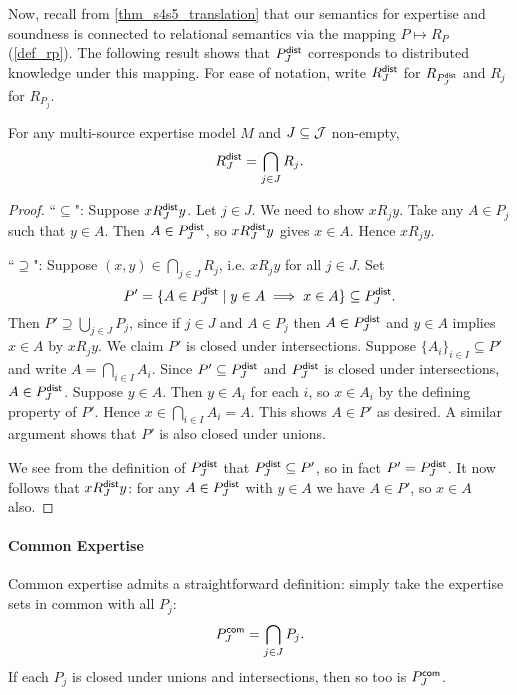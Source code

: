 Now, recall from \cref{thm_s4s5_translation} that our semantics for
expertise and soundness is connected to relational semantics via the mapping
$P \mapsto R_P$ (\cref{def_rp}). The following result shows that
$P^{\mathsf{dist}}_J$ corresponds to distributed knowledge under this mapping. For
ease of notation, write $R^{\mathsf{dist}}_J$ for $R_{P^{\mathsf{dist}}_J}$ and
$R_j$ for $R_{P_j}$.

\begin{proposition}
\label{prop_rpdist}
For any multi-source expertise model $M$ and $J \subseteq \mathcal{J}$ non-empty,
\[
R^{\mathsf{dist}}_J = \bigcap_{j \in J}{R_j}.\]
\end{proposition}

\begin{proof}
    ``$\subseteq$": Suppose $x{R^{\mathsf{dist}}_J}y$. Let $j \in J$.  We need to show
    $x{R_j}y$. Take any $A \in P_j$ such that $y \in A$. Then $A \in P^{\mathsf{dist}}_J$,
    so $x{R^{\mathsf{dist}}_J}y$ gives $x \in A$. Hence $x{R_j}y$.

    ``$\supseteq$": Suppose $(x, y) \in \bigcap_{j \in J}{R_j}$, i.e. $x{R_j}y$
    for all $j \in J$. Set
    \[
        P' = \{A \in P^{\mathsf{dist}}_J \mid y \in A \implies x \in A\}
        \subseteq P^{\mathsf{dist}}_J.
    \]
    Then $P' \supseteq \bigcup_{j \in J}{P_j}$, since if $j \in J$ and $A \in
    P_j$ then $A \in P^{\mathsf{dist}}_J$ and $y \in A$ implies $x \in A$ by $x{R_j}y$.
    We claim $P'$ is closed under intersections. Suppose $\{A_i\}_{i \in I}
    \subseteq P'$ and write $A = \bigcap_{i \in I}{A_i}$. Since $P' \subseteq
    P^{\mathsf{dist}}_J$ and $P^{\mathsf{dist}}_J$ is closed under intersections, $A \in P^{\mathsf{dist}}_J$.
    Suppose $y \in A$.  Then $y \in A_i$ for each $i$, so $x \in A_i$ by the
    defining property of $P'$. Hence $x \in \bigcap_{i \in I}{A_i} = A$. This
    shows $A \in P'$ as desired. A similar argument shows that $P'$ is also
    closed under unions.

    We see from the definition of $P^{\mathsf{dist}}_J$ that $P^{\mathsf{dist}}_J \subseteq P'$, so
    in fact $P' = P^{\mathsf{dist}}_J$. It now follows that $x{R^{\mathsf{dist}}_J}y$: for any $A \in
    P^{\mathsf{dist}}_J$ with $y \in A$ we have $A \in P'$, so $x \in A$ also.

\end{proof}

\paragraph{Common Expertise}

Common expertise admits a straightforward definition: simply take the expertise
sets in common with all $P_j$:
\[
P^{\mathsf{com}}_J = \bigcap_{j \in J}{P_j}.\]
If each $P_j$ is closed under unions and intersections, then so too is
$P^{\mathsf{com}}_J$.

